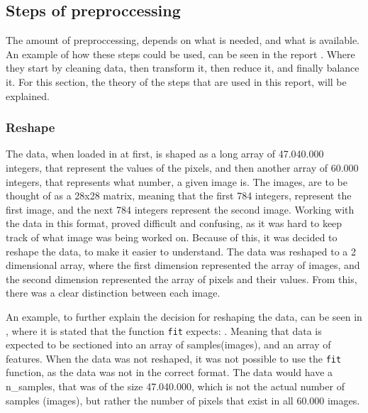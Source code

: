   
  
\subsection{Steps of preproccessing}
The amount of preproccessing, depends on what is needed, and what is available. An example of how these steps could be used, can be seen in the report \cite{Data-preprocessing-for-flight-delays}. Where they start by cleaning data, then transform it, then reduce it, and finally balance it. For this section, the theory of the steps that are used in this report, will be explained.

  

\subsubsection{Reshape}
The data, when loaded in at first, is shaped as a long array of 47.040.000 integers, that represent the values of the pixels, and then another array of 60.000 integers, that represents what number, a given image is. The images, are to be thought of as a 28x28 matrix, meaning that the first 784 integers, represent the first image, and the next 784 integers represent the second image. Working with the data in this format, proved difficult and confusing, as it was hard to keep track of what image was being worked on. Because of this, it was decided to reshape the data, to make it easier to understand. The data was reshaped to a 2 dimensional array, where the first dimension represented the array of images, and the second dimension represented the array of pixels and their values. From this, there was a clear distinction between each image.

  
An example, to further explain the decision for reshaping the data, can be seen in \cite{scikit-learn-PCA}, where it is stated that the function \texttt{fit} expects: . Meaning that data is expected to be sectioned into an array of samples(images), and an array of features. When the data was not reshaped, it was not possible to use the \texttt{fit} function, as the data was not in the correct format. The data would have a n\_samples, that was of the size 47.040.000, which is not the actual number of samples (images), but rather the number of pixels that exist in all 60.000 images.



  


